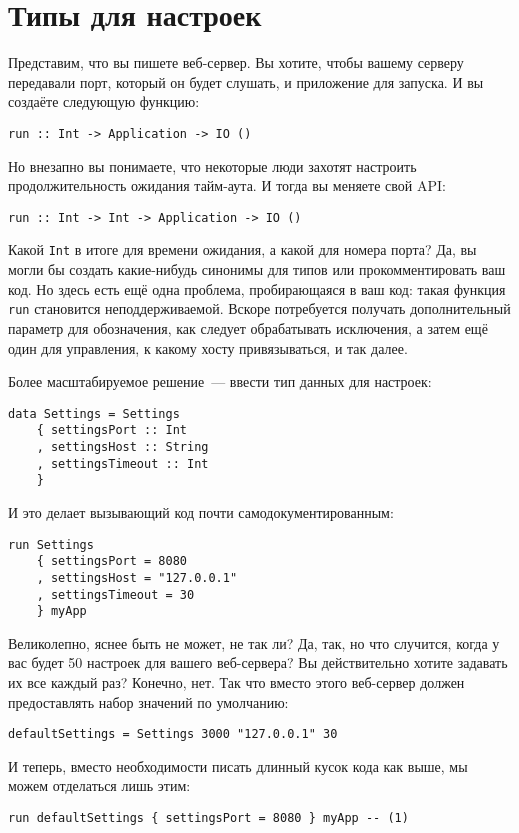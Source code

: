 \chapter{Типы для настроек} \label{chap:settings_types}
Представим, что вы пишете веб-сервер. Вы хотите, чтобы вашему серверу
передавали порт, который он будет слушать, и приложение для запуска. И вы
создаёте следующую функцию:
\begin{lstlisting}
run :: Int -> Application -> IO ()
\end{lstlisting}

Но внезапно вы понимаете, что некоторые люди захотят настроить
продолжительность ожидания тайм-аута. И тогда вы меняете свой API:
\begin{lstlisting}
run :: Int -> Int -> Application -> IO ()
\end{lstlisting}

Какой \lstinline!Int! в итоге для времени ожидания, а какой для
номера порта? Да, вы могли бы создать какие-нибудь синонимы для типов
или прокомментировать ваш код. Но здесь есть ещё одна проблема,
пробирающаяся в ваш код: такая функция \lstinline!run! становится
неподдерживаемой. Вскоре потребуется получать дополнительный параметр
для обозначения, как следует обрабатывать исключения, а затем ещё один
для управления, к какому хосту привязываться, и так далее.

Более масштабируемое решение~--- ввести тип данных для
настроек:
\begin{lstlisting}
data Settings = Settings
    { settingsPort :: Int
    , settingsHost :: String
    , settingsTimeout :: Int
    }
\end{lstlisting}
И это делает вызывающий код почти самодокументированным:
\begin{lstlisting}
run Settings
    { settingsPort = 8080
    , settingsHost = "127.0.0.1"
    , settingsTimeout = 30
    } myApp
\end{lstlisting}

Великолепно, яснее быть не может, не так ли? Да, так, но что случится, когда у вас
будет 50 настроек для вашего веб-сервера? Вы действительно хотите
задавать их все каждый раз? Конечно, нет. Так что вместо этого
веб-сервер должен предоставлять набор значений по умолчанию:
\begin{lstlisting}
defaultSettings = Settings 3000 "127.0.0.1" 30
\end{lstlisting}
И теперь, вместо необходимости писать длинный кусок кода как выше,
мы можем отделаться лишь этим:
\begin{lstlisting}
run defaultSettings { settingsPort = 8080 } myApp -- (1)
\end{lstlisting}

